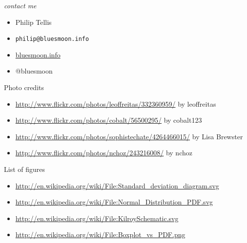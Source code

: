 \documentclass{beamer}
\begin{document}
\begin{frame}{\textit{contact me}}
  \begin{itemize}
  \item Philip Tellis
  \item \small{\texttt{philip@bluesmoon.info}}
  \item \href{http://bluesmoon.info/}{bluesmoon.info}
  \item @bluesmoon
  \end{itemize}
\end{frame}

\begin{frame}{Photo credits}
  \small{
  \begin{itemize}
  \item \href{http://www.flickr.com/photos/leoffreitas/332360959/}{http://www.flickr.com/photos/leoffreitas/332360959/} by leoffreitas
  \item \href{http://www.flickr.com/photos/cobalt/56500295/}{http://www.flickr.com/photos/cobalt/56500295/} by cobalt123
  \item \href{http://www.flickr.com/photos/sophistechate/4264466015/}{http://www.flickr.com/photos/sophistechate/4264466015/} by Lisa Brewster
  \item \href{http://www.flickr.com/photos/nchoz/243216008/}{http://www.flickr.com/photos/nchoz/243216008/} by nchoz
  \end{itemize}
  }
\end{frame}

\begin{frame}{List of figures}
  \small{
  \begin{itemize}
  \item \href{http://en.wikipedia.org/wiki/File:Standard_deviation_diagram.svg}{http://en.wikipedia.org/wiki/File:Standard\_deviation\_diagram.svg}
  \item \href{http://en.wikipedia.org/wiki/File:Normal_Distribution_PDF.svg}{http://en.wikipedia.org/wiki/File:Normal\_Distribution\_PDF.svg}
  \item \href{http://en.wikipedia.org/wiki/File:KilroySchematic.svg}{http://en.wikipedia.org/wiki/File:KilroySchematic.svg}
  \item \href{http://en.wikipedia.org/wiki/File:Boxplot_vs_PDF.png}{http://en.wikipedia.org/wiki/File:Boxplot\_vs\_PDF.png}
  \end{itemize}
  }
\end{frame}
\end{document}
